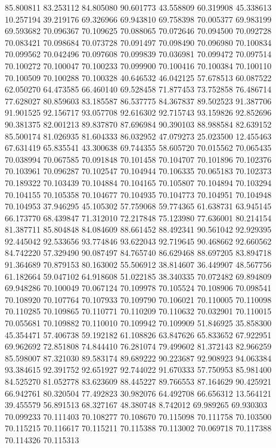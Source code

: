 85.800811
83.253112
84.805080
90.601773
43.558809
60.319908
45.338613
10.257194
39.219176
69.326966
69.943810
69.758398
70.005377
69.983199
69.593682
70.096367
70.109625
70.088065
70.072646
70.094500
70.092728
70.083421
70.098684
70.073728
70.091497
70.098490
70.096980
70.100834
70.099562
70.042496
70.097608
70.099839
70.036981
70.099472
70.097514
70.100272
70.100047
70.100233
70.099900
70.100416
70.100384
70.100110
70.100509
70.100288
70.100328
40.646532
46.042125
57.678513
60.087522
62.050270
64.473585
66.460140
69.528458
71.877453
73.752858
76.486714
77.628027
80.859603
83.185587
86.537775
84.367837
89.502523
91.387706
91.901525
92.156717
93.057708
92.616302
92.715743
93.159826
92.852696
90.381375
82.001213
89.837870
87.696984
90.390103
88.988584
82.639152
85.500174
81.026935
81.604333
86.032952
47.079273
25.023500
12.455463
67.631419
65.835541
43.300638
69.744355
58.605720
70.015562
70.065435
70.038994
70.067585
70.091848
70.101458
70.104707
70.101896
70.102376
70.103961
70.096287
70.102547
70.104944
70.106335
70.065183
70.102373
70.189322
70.103439
70.104884
70.104165
70.105807
70.104894
70.103294
70.104155
70.105358
70.104677
70.104935
70.104773
70.104951
70.104948
70.104953
37.946295
45.105302
57.759068
59.774365
61.638731
63.945145
66.173770
68.439847
71.312010
72.217848
75.123980
77.636001
80.214154
81.387711
85.804848
84.084609
88.661452
88.492341
90.561042
92.929395
92.445042
92.533656
93.774846
93.622043
92.719645
90.468662
92.660562
84.742220
57.329490
90.087497
84.765740
86.629468
88.697205
83.894718
91.364689
70.879153
80.163002
55.506912
38.814607
36.449907
48.567756
61.182664
59.047102
64.918608
51.022185
38.340335
70.072482
69.894809
69.948286
70.100049
70.067124
70.109978
70.105524
70.108906
70.098541
70.108920
70.107764
70.107933
70.109790
70.106021
70.110005
70.110098
70.110285
70.109865
70.110771
70.110209
70.110632
70.032901
70.110015
70.055681
70.109882
70.110010
70.109942
70.109909
51.846925
35.858300
45.354471
57.406738
59.192182
61.108826
63.847626
65.833652
67.922951
69.962692
72.851808
74.844410
76.281074
79.499602
81.372143
82.966259
85.598007
87.321030
89.583174
89.689222
90.223687
92.908923
94.063384
93.384615
92.391752
92.651927
92.744022
91.670333
57.750953
85.981400
84.525270
81.052778
83.623609
88.445227
89.766553
87.164629
90.425921
66.942761
80.320504
77.492823
30.982076
64.492708
66.656312
13.564121
39.455579
56.891513
68.327167
48.380748
8.742012
69.989265
69.930303
70.099233
70.111403
70.108277
70.108670
70.115098
70.111758
70.103500
70.115215
70.116617
70.115211
70.115388
70.113002
70.069718
70.117388
70.114326
70.115313
